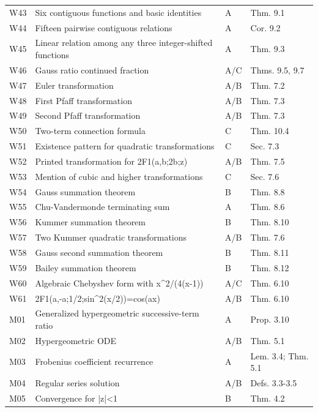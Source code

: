 \begin{longtable}{@{}p{}p{}p{}p{}@{}}
W43 & Six contiguous functions and basic identities & \textsf{A} & Thm. 9.1 \\
W44 & Fifteen pairwise contiguous relations & \textsf{A} & Cor. 9.2 \\
W45 & Linear relation among any three integer-shifted functions & \textsf{A} & Thm. 9.3 \\
W46 & Gauss ratio continued fraction & \textsf{A/C} & Thms. 9.5, 9.7 \\
W47 & Euler transformation & \textsf{A/B} & Thm. 7.2 \\
W48 & First Pfaff transformation & \textsf{A/B} & Thm. 7.3 \\
W49 & Second Pfaff transformation & \textsf{A/B} & Thm. 7.3 \\
W50 & Two-term connection formula & \textsf{C} & Thm. 10.4 \\
W51 & Existence pattern for quadratic transformations & \textsf{C} & Sec. 7.3 \\
W52 & Printed transformation for 2F1(a,b;2b;z) & \textsf{A/B} & Thm. 7.5 \\
W53 & Mention of cubic and higher transformations & \textsf{C} & Sec. 7.6 \\
W54 & Gauss summation theorem & \textsf{B} & Thm. 8.8 \\
W55 & Chu-Vandermonde terminating sum & \textsf{A} & Thm. 8.6 \\
W56 & Kummer summation theorem & \textsf{B} & Thm. 8.10 \\
W57 & Two Kummer quadratic transformations & \textsf{A/B} & Thm. 7.6 \\
W58 & Gauss second summation theorem & \textsf{B} & Thm. 8.11 \\
W59 & Bailey summation theorem & \textsf{B} & Thm. 8.12 \\
W60 & Algebraic Chebyshev form with x\textasciicircum{}2/(4(x-1)) & \textsf{A/C} & Thm. 6.10 \\
W61 & 2F1(a,-a;1/2;sin\textasciicircum{}2(x/2))=cos(ax) & \textsf{A/B} & Thm. 6.10 \\
M01 & Generalized hypergeometric successive-term ratio & \textsf{A} & Prop. 3.10 \\
M02 & Hypergeometric ODE & \textsf{A/B} & Thm. 5.1 \\
M03 & Frobenius coefficient recurrence & \textsf{A} & Lem. 3.4; Thm. 5.1 \\
M04 & Regular series solution & \textsf{A/B} & Defs. 3.3-3.5 \\
M05 & Convergence for |z|<1 & \textsf{B} & Thm. 4.2 \\

\end{longtable}
